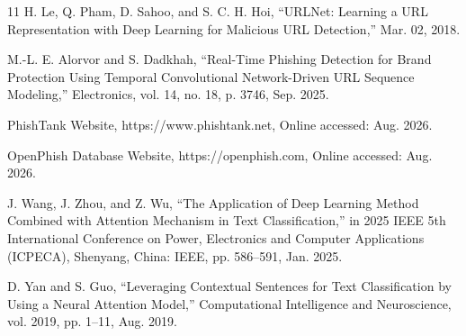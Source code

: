 \documentclass[conference]{IEEEtran}
\begin{document}
\begin{thebibliography}{11}
H. Le, Q. Pham, D. Sahoo, and S. C. H. Hoi, “URLNet: Learning a URL Representation with Deep Learning for Malicious URL Detection,” Mar. 02, 2018.

M.-L. E. Alorvor and S. Dadkhah, “Real-Time Phishing Detection for Brand Protection Using Temporal Convolutional Network-Driven URL Sequence Modeling,” Electronics, vol. 14, no. 18, p. 3746, Sep. 2025.

PhishTank Website, https://www.phishtank.net, Online accessed: Aug. 2026.

OpenPhish Database Website, https://openphish.com, Online accessed: Aug. 2026.

J. Wang, J. Zhou, and Z. Wu, “The Application of Deep Learning Method Combined with Attention Mechanism in Text Classification,” in 2025 IEEE 5th International Conference on Power, Electronics and Computer Applications (ICPECA), Shenyang, China: IEEE, pp. 586–591, Jan. 2025.

D. Yan and S. Guo, “Leveraging Contextual Sentences for Text Classification by Using a Neural Attention Model,” Computational Intelligence and Neuroscience, vol. 2019, pp. 1–11, Aug. 2019.


\end{thebibliography}
\end{document}
